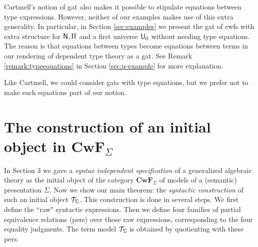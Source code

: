 \documentclass{lmcs}
\newcommand{\FYI}[1]{{\color{red}#1}}
\def\Cwf{\mathbf{CwF}}
\begin{document}
\begin{remark}
Cartmell's notion of gat \cite{cartmell:phd,cartmell:apal} also makes it possible to stipulate equations between type expressions. However, neither of our examples makes use of this extra generality. In particular,  in Section \ref{sec:examples} we present the gat of cwfs with extra structure for $\mathsf{N}, \Pi$ and a first universe $\mathsf{U}_0$ without needing type equations. The reason is that
equations between types become equations between terms in our rendering
of dependent type theory as a gat. See Remark \ref{remark:typeequations} in Section \ref{sec:u-example} for more explanation.

Like Cartmell, we could consider gats with type equations, but we prefer not to make such equations part of our notion.


\end{remark}



\section{The construction of an initial object in $\Cwf_\Sigma$}\label{initial-gat-section}

In Section 3 we gave a {\em syntax independent specification} of a generalized algebraic theory as the initial object of the category $\Cwf_\Sigma$ of models of a (semantic) \FYI{presentation} $\Sigma$. Now we show our main theorem: the {\em syntactic construction} of such an initial object ${\mathcal T}_\Sigma$. This construction is done in several steps. We first define the ``raw" syntactic expressions. Then we define four families of partial equivalence relations (pers) over those raw expressions, corresponding to the four equality judgments. The term model ${\mathcal T}_\Sigma$ is obtained by quotienting with these pers.
\end{document}
